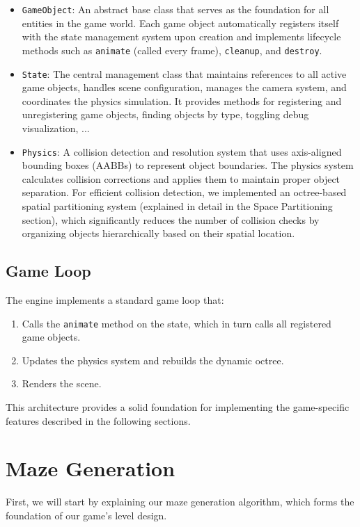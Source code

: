 \documentclass{article}
\begin{document}
\begin{itemize}
    \item \texttt{GameObject}: An abstract base class that serves as the foundation for all entities in the game world. Each game object automatically registers itself with the state management system upon creation and implements lifecycle methods such as \texttt{animate} (called every frame), \texttt{cleanup}, and \texttt{destroy}.

    \item \texttt{State}: The central management class that maintains references to all active game objects, handles scene configuration, manages the camera system, and coordinates the physics simulation. It provides methods for registering and unregistering game objects, finding objects by type, toggling debug visualization, ...

    \item \texttt{Physics}: A collision detection and resolution system that uses axis-aligned bounding boxes (AABBs) to represent object boundaries. The physics system calculates collision corrections and applies them to maintain proper object separation. For efficient collision detection, we implemented an octree-based spatial partitioning system (explained in detail in the Space Partitioning section), which significantly reduces the number of collision checks by organizing objects hierarchically based on their spatial location.
\end{itemize}

\subsection{Game Loop}
The engine implements a standard game loop that:

\begin{enumerate}
    \item Calls the \texttt{animate} method on the state, which in turn calls all registered game objects.
    \item Updates the physics system and rebuilds the dynamic octree.
    \item Renders the scene.
\end{enumerate}

This architecture provides a solid foundation for implementing the game-specific features described in the following sections.

\section{Maze Generation}
First, we will start by explaining our maze generation algorithm, which forms the foundation of our game's level design.
\end{document}
